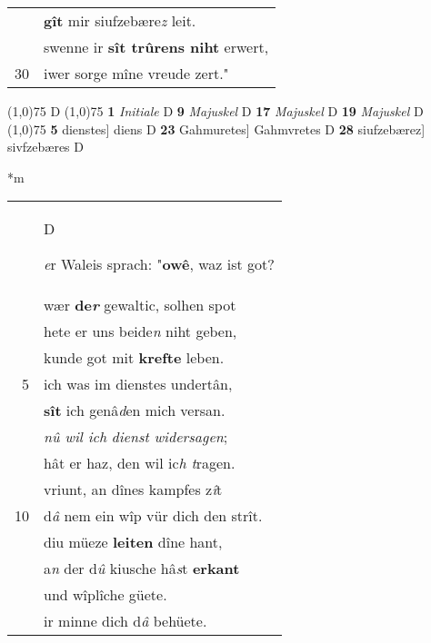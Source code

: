 \documentclass[8pt,a4paper,notitlepage]{article}
\begin{document}
\begin{table}[ht]
\begin{minipage}[t]{0.5\linewidth}
\begin{tabular}{rl}
 & \textbf{gît} mir siufzebære\textit{z} leit.\\ 
 & swenne ir \textbf{sît trûrens niht} erwert,\\ 
30 & iwer sorge mîne vreude zert."\\ 
\end{tabular}
\scriptsize
\line(1,0){75} \newline
D \newline
\line(1,0){75} \newline
\textbf{1} \textit{Initiale} D  \textbf{9} \textit{Majuskel} D  \textbf{17} \textit{Majuskel} D  \textbf{19} \textit{Majuskel} D  \newline
\line(1,0){75} \newline
\textbf{5} dienstes] diens D \textbf{23} Gahmuretes] Gahmvretes D \textbf{28} siufzebærez] sivfzebæres D \newline
\end{minipage}
\hspace{0.5cm}
\begin{minipage}[t]{0.5\linewidth}
\small
\begin{center}*m
\end{center}
\begin{tabular}{rl}
 & \begin{large}D\end{large}\textit{e}r Waleis sprach: "\textbf{owê}, waz ist got?\\ 
 & wær \textbf{de\textit{r}} gewaltic, solhen spot\\ 
 & hete er uns beide\textit{n} niht geben,\\ 
 & kunde got mit \textbf{krefte} leben.\\ 
5 & ich was im dienstes undertân,\\ 
 & \textbf{sît} ich genâ\textit{d}en mich versan.\\ 
 & \textit{nû wil ich} \textit{dienst widersagen};\\ 
 & hât er haz, den wil ic\textit{h t}ragen.\\ 
 & vriunt, an dînes kampfes z\textit{î}t\\ 
10 & d\textit{â} nem ein wîp vür dich den strît.\\ 
 & diu müeze \textbf{leiten} dîne hant,\\ 
 & a\textit{n} der d\textit{û} kiusche hâ\textit{s}t \textbf{erkant}\\ 
 & und wîplîche güete.\\ 
 & ir minne dich d\textit{â} behüete.\\ 

\end{tabular}
\end{minipage}
\end{table}
\end{document}

